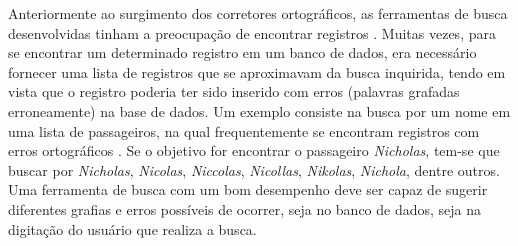 \documentclass{textolivre}
\begin{document}
Anteriormente ao surgimento dos corretores ortográficos, as ferramentas de busca desenvolvidas tinham a preocupação
de encontrar registros \cite{glantz1956,davidson1962}.
Muitas vezes, para se encontrar um determinado registro em um banco de dados, era necessário fornecer uma 
lista de registros que se aproximavam da busca inquirida, tendo em vista que o
registro poderia
ter sido inserido com erros (palavras grafadas
erroneamente) na base de dados. Um exemplo consiste na busca por um nome em uma
lista de passageiros, na qual frequentemente se encontram registros com erros ortográficos \cite{davidson1962}.
Se o objetivo for encontrar o passageiro \textit{Nicholas}, tem-se que buscar por \textit{Nicholas}, 
\textit{Nicolas}, \textit{Niccolas}, \textit{Nicollas}, \textit{Nikolas}, \textit{Nichola}, dentre outros.
Uma ferramenta de busca com um bom
desempenho deve ser capaz de sugerir diferentes grafias e erros
possíveis de ocorrer, seja no banco de dados, seja na digitação do usuário que realiza a busca.
\end{document}
